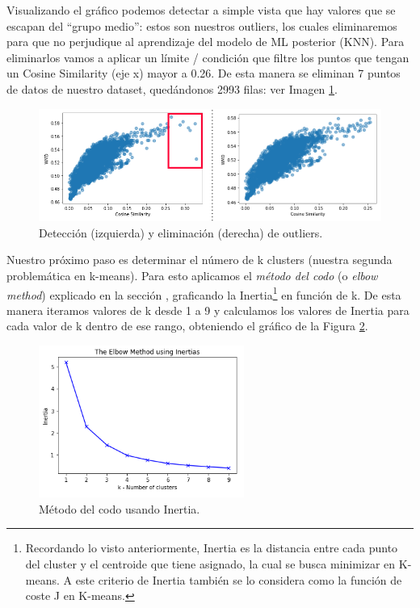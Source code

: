 \documentclass[12pt,a4paper]{article}
\begin{document}
\begin{sloppypar}
Visualizando el gráfico podemos detectar a simple vista que hay valores que se escapan del “grupo medio”: estos son nuestros outliers, los cuales eliminaremos para que no perjudique al aprendizaje del modelo de ML posterior (KNN). Para eliminarlos vamos a aplicar un límite / condición que filtre los puntos que tengan un Cosine Similarity (eje x) mayor a 0.26. De esta manera se eliminan 7 puntos de datos de nuestro dataset, quedándonos 2993 filas: ver Imagen \ref{fig:detec_elim_outliers}.

\begin{figure}[H]   
\centering
\includegraphics[width=1\textwidth]{images/implementacion_5/detec_elim_outliers.png}
\caption{Detección (izquierda) y eliminación (derecha) de outliers.}
\label{fig:detec_elim_outliers}
\end{figure}

Nuestro próximo paso es determinar el número de k clusters (nuestra segunda problemática en k-means). Para esto aplicamos el \textit{método del codo} (o \textit{elbow method}) explicado en la sección \textit{}, graficando la Inertia\footnote{Recordando lo visto anteriormente, Inertia es la distancia entre cada punto del cluster y el centroide que tiene asignado, la cual se busca minimizar en K-means. A este criterio de Inertia también se lo considera como la función de coste J en K-means.} en función de k. De esta manera iteramos valores de k desde 1 a 9 y calculamos los valores de Inertia para cada valor de k dentro de ese rango, obteniendo el gráfico de la Figura \ref{fig:elbow_method_inertia}.

\begin{figure}[H]   
\centering
\includegraphics[width=0.6\textwidth]{images/implementacion_5/elbow_method_inertia.png}
\caption{Método del codo usando Inertia.}
\label{fig:elbow_method_inertia}
\end{figure}


\end{sloppypar}
\end{document}
